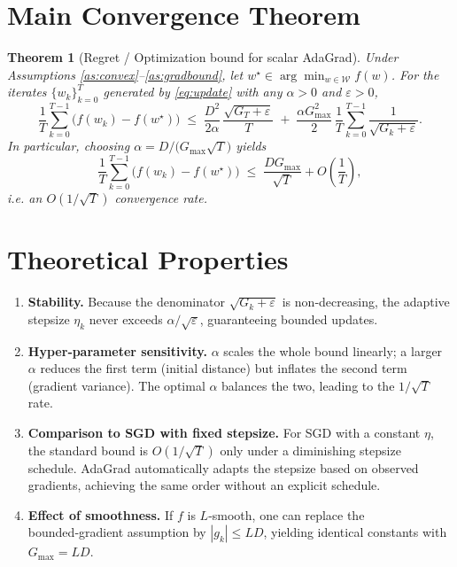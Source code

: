 \documentclass[11pt]{article}
\newtheorem{theorem}{Theorem}
\begin{document}
\section*{Main Convergence Theorem}
\begin{theorem}[Regret / Optimization bound for scalar AdaGrad]\label{thm:main}
Under Assumptions \ref{as:convex}–\ref{as:gradbound}, let $w^\star\in\arg\min_{w\in\mathcal{W}} f(w)$.  
For the iterates $\{w_k\}_{k=0}^{T}$ generated by \eqref{eq:update} with any $\alpha>0$ and $\varepsilon>0$,
\[
\frac{1}{T}\sum_{k=0}^{T-1}\bigl(f(w_k)-f(w^\star)\bigr)
\;\le\;
\frac{D^{2}}{2\alpha}\,\frac{\sqrt{G_T+\varepsilon}}{T}
\;+\;
\frac{\alpha G_{\max }^{2}}{2}\,\frac{1}{T}\sum_{k=0}^{T-1}\frac{1}{\sqrt{G_k+\varepsilon}} .
\]
In particular, choosing $\alpha=D/\bigl(G_{\max }\sqrt{T}\bigr)$ yields
\[
\frac{1}{T}\sum_{k=0}^{T-1}\bigl(f(w_k)-f(w^\star)\bigr)
\;\le\;
\frac{DG_{\max }}{\sqrt{T}}+O\!\left(\frac{1}{T}\right),
\]
i.e. an $O(1/\sqrt{T})$ convergence rate.
\end{theorem}

\section*{Theoretical Properties}
\begin{enumerate}[label=\arabic*.]
\item \textbf{Stability.}  
Because the denominator $\sqrt{G_k+\varepsilon}$ is non‑decreasing, the adaptive stepsize $\eta_k$ never exceeds $\alpha/\sqrt{\varepsilon}$, guaranteeing bounded updates.

\item \textbf{Hyper‑parameter sensitivity.}  
$\alpha$ scales the whole bound linearly; a larger $\alpha$ reduces the first term (initial distance) but inflates the second term (gradient variance). The optimal $\alpha$ balances the two, leading to the $1/\sqrt{T}$ rate.

\item \textbf{Comparison to SGD with fixed stepsize.}  
For SGD with a constant $\eta$, the standard bound is $O(1/\sqrt{T})$ only under a diminishing stepsize schedule. AdaGrad automatically adapts the stepsize based on observed gradients, achieving the same order without an explicit schedule.

\item \textbf{Effect of smoothness.}  
If $f$ is $L$‑smooth, one can replace the bounded‑gradient assumption by $|g_k|\le L D$, yielding identical constants with $G_{\max}=L D$.

\end{enumerate}
\end{document}
